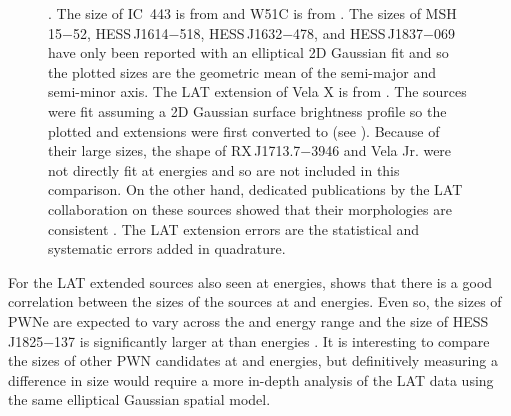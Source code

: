 \begin{figure}[htbp]
{    \cite{aharonian_2005a_discovery-extended,aharonian_2006_energy-dependent,aharonian_2006a_first-detection,aharonian_2007a_h.e.s.s.-observations,aharonian_2007a_primary-particle,aharonian_2008a_discovery-energy}.
    The \tev size of IC~443 is from \cite{acciari_2009a_observation-extended} and
    W51C is from \cite{krause_2011a_probing-proton}.  The \tev
    sizes of MSH\,15$-$52, HESS\,J1614$-$518, HESS\,J1632$-$478, and
    HESS\,J1837$-$069 have only been reported with an elliptical 2D
    Gaussian fit and so the plotted sizes are the geometric 
    mean of the semi-major and semi-minor axis.
    The LAT extension of
    Vela X is from \cite{abdo_2010c_fermi-large}. 
    The \tev sources were fit assuming a 2D Gaussian surface brightness profile
    so the plotted \gev and \tev extensions were first converted to
    \rsixeight (see ).  
    Because of
    their large sizes, the shape of RX\,J1713.7$-$3946 and Vela Jr.
    were not directly fit at \tev energies and so are not included
    in this comparison. On the other hand, dedicated publications by the 
    LAT collaboration on
    these sources showed that their morphologies are consistent
    \citep{abdo_2011a_observations-young,tanaka_2011a_gamma-ray-observations}.
    The LAT
    extension errors are the statistical and systematic errors added
    in quadrature. 
}
  \end{figure}

For the LAT extended sources also seen at \tev energies,
 shows that there is a good correlation
between the sizes of the sources at \gev and \tev energies. Even so,
the sizes of PWNe are expected to vary across the \gev and \tev energy
range and the size of HESS\,J1825$-$137 is significantly larger at
\gev than \tev energies \citep{grondin_2011_detection-pulsar}.  It is interesting
to compare the sizes of other PWN candidates at \gev and \tev energies,
but definitively measuring a difference in size would require a more in-depth analysis
of the LAT data using the same elliptical Gaussian spatial model.


